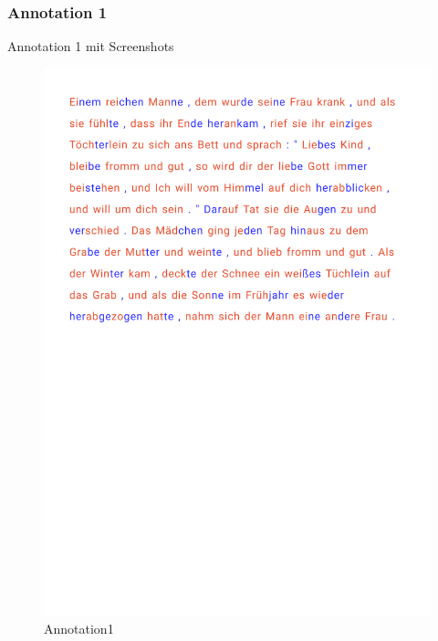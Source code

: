 \subsubsection{Annotation 1}
Annotation 1 mit Screenshots
\begin{figure}[h!]
	\centering
	\includegraphics[width=.7\linewidth, frame]{figures/evaluation/annotation1}
	\caption{Annotation1}
	\label{fig:frontend-home}
\end{figure}
\newpage

